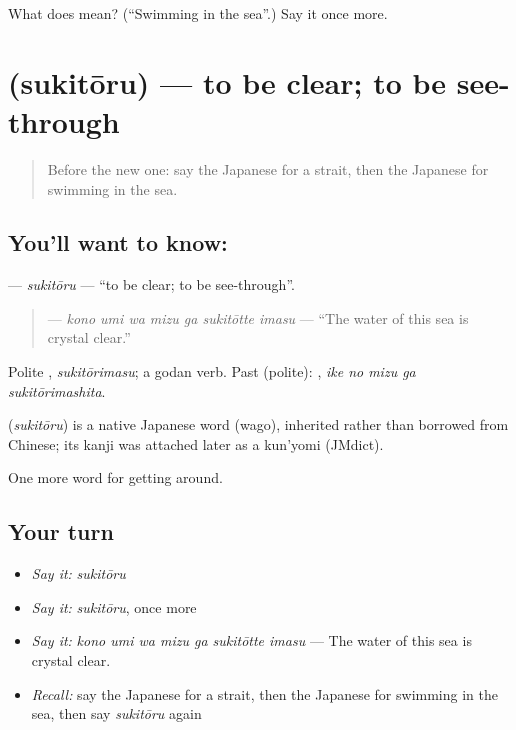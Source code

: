 \begin{tcolorbox}[breakable,colback=teal!4,colframe=teal!35!black,title={Before you move on}]
What does  mean? (\textquotedblleft{}Swimming in the sea\textquotedblright{}.) Say it once more.
\end{tcolorbox}
\section[\texorpdfstring{\ja{すきとおる} (sukitōru)}{すきとおる (sukitōru)}]{ (sukitōru) — to be clear; to be see-through}

\label{lesson:JA-C383-sukitouru}



\begin{quote}
Before the new one: say the Japanese for a strait, then the Japanese for swimming in the sea.
\end{quote}

\subsection*{You'll want to know: }
\textbf{} — \emph{sukitōru} — \textquotedblleft{}to be clear; to be see-through\textquotedblright{}.

\begin{quote}
\textbf{   } — \emph{kono umi wa mizu ga sukitōtte imasu} — \textquotedblleft{}The water of this sea is crystal clear.\textquotedblright{}
\end{quote}

Polite \textbf{}, \emph{sukitōrimasu}; a godan verb. Past (polite): \textbf{  }, \emph{ike no mizu ga sukitōrimashita}.

\begin{cousinweb}
\textbf{} (\emph{sukitōru}) is a native Japanese word (wago), inherited rather than borrowed from Chinese; its kanji was attached later as a kun'yomi (JMdict).
\end{cousinweb}

\begin{grammarlens}[title={What you've built}]
One more word for getting around.
\end{grammarlens}

\subsection*{Your turn}
\begin{itemize}
\raggedright
  \item \emph{Say it:} \emph{sukitōru}
  \item \emph{Say it:} \emph{sukitōru}, once more
  \item \emph{Say it:} \emph{kono umi wa mizu ga sukitōtte imasu} — The water of this sea is crystal clear.
  \item \emph{Recall:} say the Japanese for a strait, then the Japanese for swimming in the sea, then say \emph{sukitōru} again
\end{itemize}

